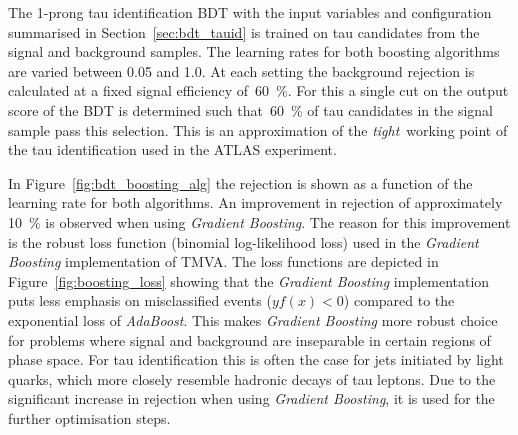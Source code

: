 The 1-prong tau identification BDT with the input variables and configuration
summarised in Section~\ref{sec:bdt_tauid} is trained on tau candidates from the
signal and background samples. The learning rates for both boosting algorithms
are varied between 0.05 and 1.0. At each setting the background rejection is
calculated at a fixed signal efficiency of~\SI{60}{\percent}. For this a single
cut on the output score of the BDT is determined such that~\SI{60}{\percent} of
tau candidates in the signal sample pass this selection. This is an
approximation of the \emph{tight}~working point of the tau identification used
in the ATLAS experiment.

In Figure~\ref{fig:bdt_boosting_alg} the rejection is shown as a function of the
learning rate for both algorithms. An improvement in rejection of approximately
\SI{10}{\percent} is observed when using \emph{Gradient Boosting}. The reason
for this improvement is the robust loss function (binomial log-likelihood loss)
used in the \emph{Gradient Boosting} implementation of TMVA. The loss functions
are depicted in Figure~\ref{fig:boosting_loss} showing that the \emph{Gradient
  Boosting} implementation puts less emphasis on misclassified events
($y f(x) < 0$) compared to the exponential loss of \emph{AdaBoost}. This makes
\emph{Gradient Boosting} more robust choice for problems where signal and
background are inseparable in certain regions of phase space. For tau
identification this is often the case for jets initiated by light quarks, which
more closely resemble hadronic decays of tau leptons. Due to the significant
increase in rejection when using \emph{Gradient Boosting}, it is used for the
further optimisation steps.

